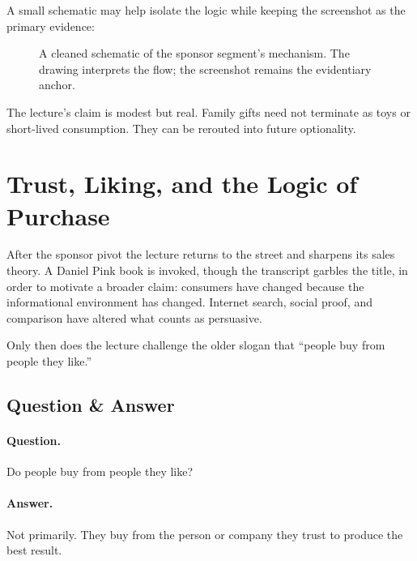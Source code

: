 A small schematic may help isolate the logic while keeping the screenshot as the primary evidence:
\begin{figure}[h]
\centering
{}
\caption{A cleaned schematic of the sponsor segment's mechanism. The drawing interprets the flow; the screenshot remains the evidentiary anchor.}
\end{figure}

The lecture's claim is modest but real. Family gifts need not terminate as toys or short-lived consumption. They can be rerouted into future optionality.

\section{Trust, Liking, and the Logic of Purchase}

After the sponsor pivot the lecture returns to the street and sharpens its sales theory. A Daniel Pink book is invoked, though the transcript garbles the title, in order to motivate a broader claim: consumers have changed because the informational environment has changed. Internet search, social proof, and comparison have altered what counts as persuasive.

Only then does the lecture challenge the older slogan that ``people buy from people they like.''

\subsection{Question \& Answer}

\paragraph{Question.} Do people buy from people they like?

\paragraph{Answer.} Not primarily. They buy from the person or company they trust to produce the best result.

